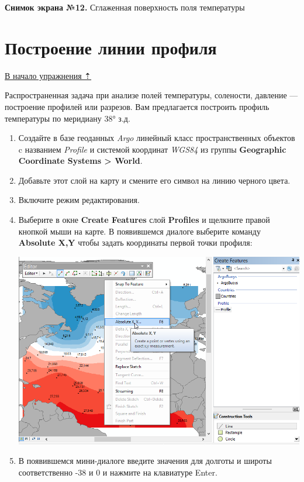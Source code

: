 \documentclass[]{book}
\theoremstyle{definition}
\theoremstyle{definition}
\theoremstyle{definition}
\theoremstyle{remark}
\begin{document}
\begin{enumerate}
  \textbf{Снимок экрана №12.} Сглаженная поверхность поля температуры
\end{enumerate}

\hypertarget{interpolation-profile}{%
\section{Построение линии профиля}\label{interpolation-profile}}

\protect\hyperlink{interpolation}{В начало упражнения ⇡}

Распространенная задача при анализе полей температуры, солености,
давление --- построение профилей или разрезов. Вам предлагается
построить профиль температуры по меридиану 38° з.д.

\begin{enumerate}
\def\labelenumi{\arabic{enumi}.}
\item
  Создайте в базе геоданных \emph{Argo} линейный класс пространственных
  объектов c названием \emph{Profile} и системой координат \emph{WGS84}
  из группы \textbf{Geographic Coordinate Systems \textgreater{} World}.
\item
  Добавьте этот слой на карту и смените его символ на линию черного
  цвета.
\item
  Включите режим редактирования.
\item
  Выберите в окне \textbf{Create Features} слой \textbf{Profiles} и
  щелкните правой кнопкой мыши на карте. В появившемся диалоге выберите
  команду \textbf{Absolute X,Y} чтобы задать координаты первой точки
  профиля:

  \includegraphics{images/Ex17/image17.png}
\item
  В появившемся мини-диалоге введите значения для долготы и широты
  соответственно -38 и 0 и нажмите на клавиатуре Enter.


\end{enumerate}
\end{document}
